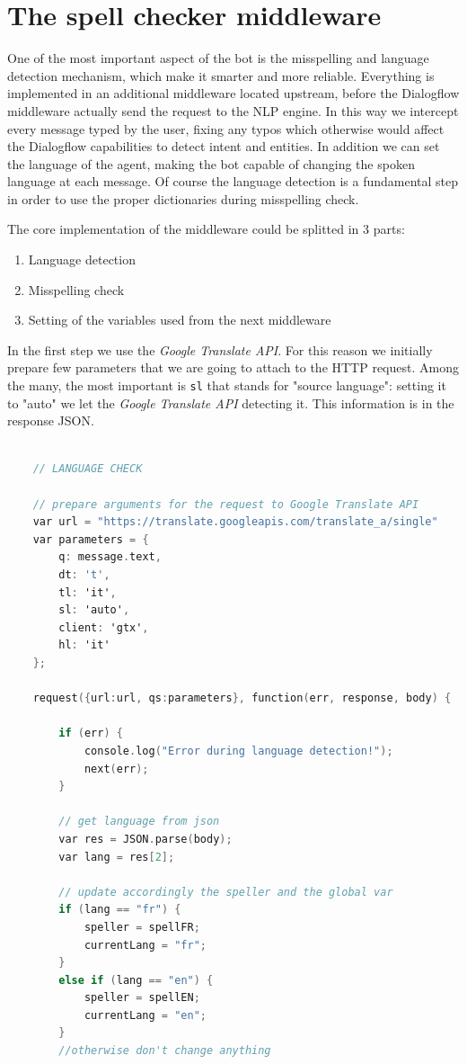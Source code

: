 \documentclass[a4paper,12pt]{report}
\begin{document}
	\section{The spell checker middleware}
	One of the most important aspect of the bot is the misspelling and language detection mechanism, which make it smarter and more reliable. Everything is implemented in an additional middleware located upstream, before the Dialogflow middleware actually send the request to the NLP engine. In this way we intercept every message typed by the user, fixing any typos which otherwise would affect the Dialogflow capabilities to detect intent and entities. In addition we can set the language of the agent, making the bot capable of changing the spoken language at each message. Of course the language detection is a fundamental step in order to use the proper dictionaries during misspelling check.
	
	The core implementation of the middleware could be splitted in 3 parts:
	\begin{enumerate}
		\item Language detection
		\item Misspelling check
		\item Setting of the variables used from the next middleware
	\end{enumerate}
	In the first step we use the \textit{Google Translate API}. For this reason we initially prepare few parameters that we are going to attach to the HTTP request. Among the many, the most important is \texttt{sl} that stands for "source language": setting it to "auto" we let the \textit{Google Translate API} detecting it. This information is in the response JSON.
	
	\begin{lstlisting}[language=C]
	
	// LANGUAGE CHECK
	
	// prepare arguments for the request to Google Translate API
	var url = "https://translate.googleapis.com/translate_a/single"
	var parameters = { 
		q: message.text, 
		dt: 't',
		tl: 'it',
		sl: 'auto',
		client: 'gtx',
		hl: 'it'
	};
	
	request({url:url, qs:parameters}, function(err, response, body) {
	
		if (err) {
			console.log("Error during language detection!");
			next(err);
		}
		
		// get language from json
		var res = JSON.parse(body);
		var lang = res[2];
		
		// update accordingly the speller and the global var 
		if (lang == "fr") {
			speller = spellFR;
			currentLang = "fr";
		}
		else if (lang == "en") {
			speller = spellEN;
			currentLang = "en";
		}
		//otherwise don't change anything
	\end{lstlisting}
	
\end{document}
